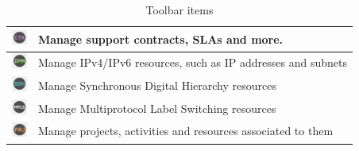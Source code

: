 \documentclass[a4paper]{article}
\begin{document}
\begin{table}[h!]
\begin{tabular}{cl}
			\midrule
			\includegraphics[width=0.5cm]{img/icon_contract_manager.png} & Manage support contracts, SLAs and more. \\
			\midrule
			\includegraphics[width=0.5cm]{img/icon_IPAM_manager.png} & Manage IPv4/IPv6 resources, such as IP addresses and subnets\\
			\midrule
			\includegraphics[width=0.5cm]{img/icon_SDH_networks.png} & Manage Synchronous Digital Hierarchy resources\\
			\midrule
			\includegraphics[width=0.5cm]{img/icon_MPLS_mudule.png} & Manage Multiprotocol Label Switching resources\\
			\midrule
			\includegraphics[width=0.5cm]{img/icon_projects.png} & Manage projects, activities and resources associated to them\\
		\end{tabular}	
		\caption{Toolbar items}
		\label{tab:toolbar_icons}
	\end{table}
		
	\clearpage
\end{document}
